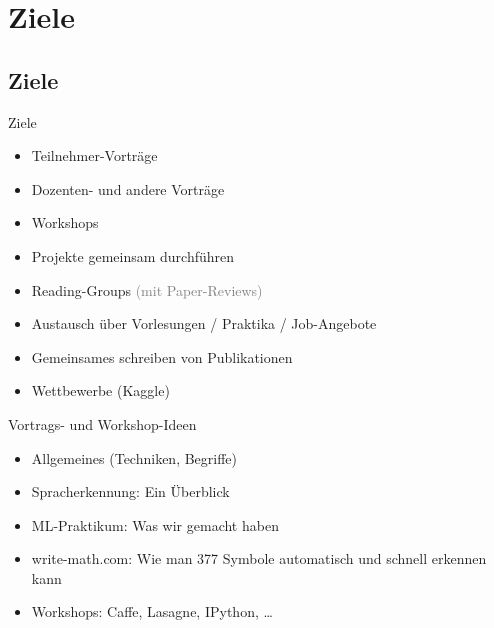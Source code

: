 \section{Ziele}
\subsection*{Ziele}

\begin{frame}{Ziele}
    \begin{itemize}
        \item Teilnehmer-Vorträge
        \item Dozenten- und andere Vorträge
        \item Workshops
        \item Projekte gemeinsam durchführen
        \item Reading-Groups \textcolor{gray}{(mit Paper-Reviews)}
        \item Austausch über Vorlesungen / Praktika / Job-Angebote
        \item Gemeinsames schreiben von Publikationen
        \item Wettbewerbe (Kaggle)
    \end{itemize}
\end{frame}

\begin{frame}{Vortrags- und Workshop-Ideen}
    \begin{itemize}
        \item Allgemeines (Techniken, Begriffe)
        \item Spracherkennung: Ein Überblick
        \item ML-Praktikum: Was wir gemacht haben
        \item write-math.com: Wie man 377 Symbole automatisch und schnell
              erkennen kann
        \item Workshops: Caffe, Lasagne, IPython, \dots
    \end{itemize}
\end{frame}